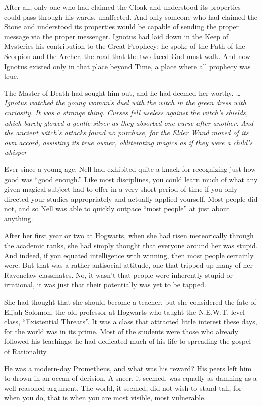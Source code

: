 After all, only one who had claimed the Cloak and understood its properties could pass through his wards, unaffected. And only someone who had claimed the Stone and understood its properties would be capable of sending the proper message via the proper messenger. Ignotus had laid down in the Keep of Mysteries his contribution to the Great Prophecy; he spoke of the Path of the Scorpion and the Archer, the road that the two-faced God must walk. And now Ignotus existed only in that place beyond Time, a place where all prophecy was true.

The Master of Death had sought him out, and he had deemed her worthy.
\simpleline
\emph{…Ignotus watched the young woman’s duel with the witch in the green dress with curiosity. It was a strange thing. Curses fell useless against the witch’s shields, which barely glowed a gentle silver as they absorbed one curse after another. And the ancient witch’s attacks found no purchase, for the Elder Wand moved of its own accord, assisting its true owner, obliterating magics as if they were a child’s whisper-}
\simpleline
{}

Ever since a young age, Nell had exhibited quite a knack for recognizing just how good was “good enough.” Like most disciplines, you could learn much of what any given magical subject had to offer in a very short period of time if you only directed your studies appropriately and actually applied yourself. Most people did not, and so Nell was able to quickly outpace “most people” at just about anything.

After her first year or two at Hogwarts, when she had risen meteorically through the academic ranks, she had simply thought that everyone around her was stupid. And indeed, if you equated intelligence with winning, then most people certainly were. But that was a rather antisocial attitude, one that tripped up many of her Ravenclaw classmates. No, it wasn’t that people were inherently stupid or irrational, it was just that their potentially was yet to be tapped.

She had thought that she should become a teacher, but she considered the fate of Elijah Solomon, the old professor at Hogwarts who taught the N.E.W.T.-level class, “Existential Threats”. It was a class that attracted little interest these days, for the world was in its prime. Most of the students were those who already followed his teachings: he had dedicated much of his life to spreading the gospel of Rationality.

He was a modern-day Prometheus, and what was his reward? His peers left him to drown in an ocean of derision. A sneer, it seemed, was equally as damning as a well-reasoned argument. The world, it seemed, did not wish to stand tall, for when you do, that is when you are most visible, most vulnerable.

